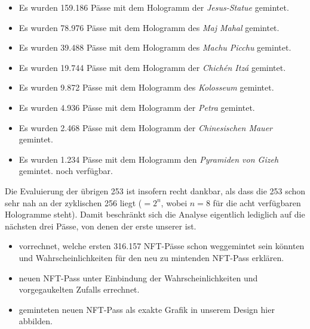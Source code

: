 \begin{itemize}
  \item Es wurden 159.186 Pässe mit dem Hologramm der \textit{Jesus-Statue} gemintet.
  \item Es wurden 78.976 Pässe mit dem Hologramm des \textit{Maj Mahal} gemintet.
  \item Es wurden 39.488 Pässe mit dem Hologramm des \textit{Machu Picchu} gemintet.
  \item Es wurden 19.744 Pässe mit dem Hologramm der \textit{Chichén Itzá} gemintet.
  \item Es wurden 9.872 Pässe mit dem Hologramm des \textit{Kolosseum} gemintet.
  \item Es wurden 4.936 Pässe mit dem Hologramm der \textit{Petra} gemintet.
  \item Es wurden 2.468 Pässe mit dem Hologramm der \textit{Chinesischen Mauer} gemintet.
  \item Es wurden 1.234 Pässe mit dem Hologramm den \textit{Pyramiden von Gizeh} gemintet. noch verfügbar.
\end{itemize}

\vspace{0.3cm}

Die Evaluierung der übrigen 253 ist insofern recht dankbar, als dass die 253 schon sehr nah an der zyklischen 256 liegt ($= 2^{n}$, wobei $n=8$ für die acht verfügbaren Hologramme steht). Damit beschränkt sich die Analyse eigentlich lediglich auf die nächsten drei Pässe, von denen der erste unserer ist. 











\vspace{0.5cm}

\begin{itemize}
  \item vorrechnet, welche ersten 316.157 NFT-Pässe schon weggemintet sein könnten und Wahrscheinlichkeiten für den neu zu mintenden NFT-Pass erklären.
  \item neuen NFT-Pass unter Einbindung der Wahrscheinlichkeiten und vorgegaukelten Zufalls errechnet.
  \item geminteten neuen NFT-Pass als exakte Grafik in unserem Design hier abbilden.
\end{itemize}

\vspace{0.3cm}
